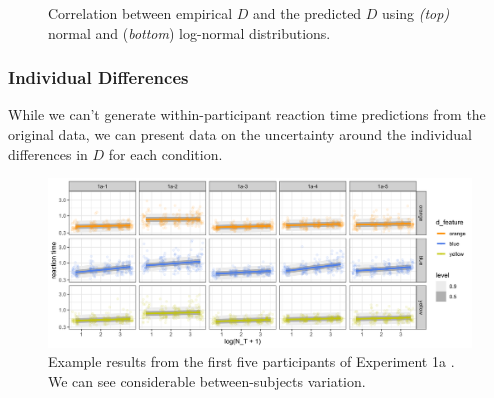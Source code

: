 \documentclass[smallextended]{svjour3}       %
\begin{document}
\begin{figure}
\centering
{}
\caption{Correlation between empirical $D$ and the predicted $D$ using \textit{(top)} normal and (\textit{bottom}) log-normal distributions.}
\label{fig:buetti2019_D}
\end{figure}

\subsubsection{Individual Differences}

While we can't generate within-participant reaction time predictions from the original data, we can present data on the uncertainty around the individual differences in $D$ for each condition. 

\begin{figure}
\centering
\includegraphics[width=\textwidth]{../wd_reanalyse_Buetti2019/exp1_fits.png}
\caption{Example results from the first five participants of Experiment 1a \cite{buetti2019predicting}. We can see considerable between-subjects variation. }
\label{fig:buetti2019_a1}
\end{figure}
\end{document}
